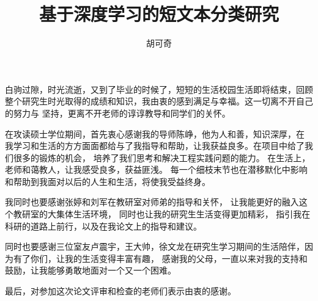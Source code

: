 \documentclass[master]{thesis-uestc}
\title{基于深度学习的短文本分类研究}
\author{胡可奇}
\begin{document}
    
    
    \thesistableofcontents
    
    
    
    
    
    

    \thesisacknowledgement
    白驹过隙，时光流逝，又到了毕业的时候了，短短的生活校园生活即将结束，回顾
    整个研究生时光取得的成绩和知识，我由衷的感到满足与幸福。这一切离不开自己的努力与
    坚持，更离不开老师的谆谆教导和同学们的关怀。
    
    在攻读硕士学位期间，首先衷心感谢我的导师陈峥，他为人和善，知识深厚，在
    我学习和生活的方方面面都给与了我指导和帮助，让我获益良多。在项目中给了我们很多的锻炼的机会，
    培养了我们思考和解决工程实践问题的能力。
    在生活上，老师和蔼教人，让我感受良多，获益匪浅。
    每一个细枝末节也在潜移默化中影响和帮助到我面对以后的人生和生活，将使我受益终身。

    我同时也要感谢张婷和刘军在教研室对师弟的指导和关怀，
    让我能更好的融入这个教研室的大集体生活环境，
    同时也让我的研究生生活变得更加精彩，
    指引我在科研的道路上前行，以及在我论文上的指导和建议。

    同时也要感谢三位室友卢震宇，王大帅，徐文龙在研究生学习期间的生活陪伴，因为有了你们，让我的生活变得丰富有趣，
    感谢我的父母，一直以来对我的支持和鼓励，让我能够勇敢地面对一个又一个困难。

    最后，对参加这次论文评审和检查的老师们表示由衷的感谢。

    


\end{document}
